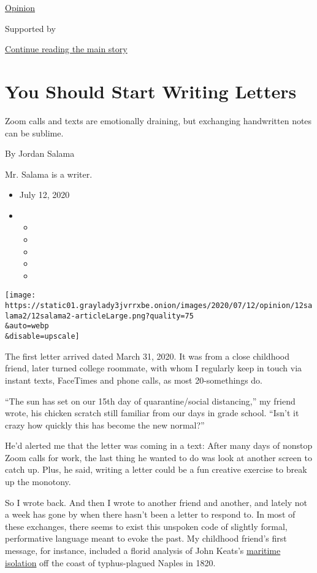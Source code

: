 \href{/section/opinion}{Opinion}

Supported by

\protect\hyperlink{after-sponsor}{Continue reading the main story}

\hypertarget{you-should-start-writing-letters}{%
\section{You Should Start Writing
Letters}\label{you-should-start-writing-letters}}

Zoom calls and texts are emotionally draining, but exchanging
handwritten notes can be sublime.

By Jordan Salama

Mr. Salama is a writer.

\begin{itemize}
\item
  July 12, 2020
\item
  \begin{itemize}
  \item
  \item
  \item
  \item
  \item
  \end{itemize}
\end{itemize}

\texttt{[image: https://static01.graylady3jvrrxbe.onion/images/2020/07/12/opinion/12salama2/12salama2-articleLarge.png?quality=75\\\&auto=webp\\\&disable=upscale]}

The first letter arrived dated March 31, 2020. It was from a close
childhood friend, later turned college roommate, with whom I regularly
keep in touch via instant texts, FaceTimes and phone calls, as most
20-somethings do.

``The sun has set on our 15th day of quarantine/social distancing,'' my
friend wrote, his chicken scratch still familiar from our days in grade
school. ``Isn't it crazy how quickly this has become the new normal?''

He'd alerted me that the letter was coming in a text: After many days of
nonstop Zoom calls for work, the last thing he wanted to do was look at
another screen to catch up. Plus, he said, writing a letter could be a
fun creative exercise to break up the monotony.

So I wrote back. And then I wrote to another friend and another, and
lately not a week has gone by when there hasn't been a letter to respond
to. In most of these exchanges, there seems to exist this unspoken code
of slightly formal, performative language meant to evoke the past. My
childhood friend's first message, for instance, included a florid
analysis of John Keats's
\href{https://www.nytimes3xbfgragh.onion/2020/03/26/travel/coronavirus-essay-mayes-keats.html?searchResultPosition=1}{maritime
isolation} off the coast of typhus-plagued Naples in 1820.

